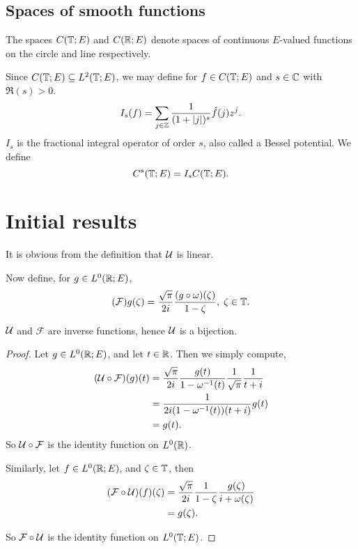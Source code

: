 \documentclass{unswmaths}
\begin{document}
\subsection*{Spaces of smooth functions}
The spaces $C(\mathbb{T};E)$ and $C(\mathbb{R};E)$ denote spaces of continuous $E$-valued functions on
the circle and line respectively.

Since $C(\mathbb{T};E) \subseteq L^2(\mathbb{T};E)$, we may define for $f \in C(\mathbb{T};E)$
and $s \in \mathbb{C}$ with $\Re(s) > 0$. 
\begin{equation*}
    I_s(f) = \sum_{j \in \mathbb{Z}} \frac{1}{(1+|j|)^s}\hat{f}(j)z^j.
\end{equation*}
$I_s$ is the fractional integral operator of order $s$, also called a Bessel potential.
We define
\begin{equation*}
    C^s(\mathbb{T};E) = I_sC(\mathbb{T};E).
\end{equation*}


\section*{Initial results}
It is obvious from the definition that $\mathcal{U}$ is linear. 

Now define, for $g \in L^0(\mathbb{R};E)$,
\begin{equation*}
    (\mathcal{F})g(\zeta) = \frac{\sqrt{\pi}}{2i}\frac{(g\circ \omega)(\zeta)}{1-\zeta},\;\zeta\in\mathbb{T}.
\end{equation*}

\begin{lemma}
    $\mathcal{U}$ and $\mathcal{F}$ are inverse functions, hence $\mathcal{U}$ is a bijection.
\end{lemma}
\begin{proof}
    Let $g \in L^0(\mathbb{R};E)$, and let $t \in \mathbb{R}$. Then we simply compute,
    \begin{align*}
        (\mathcal{U}\circ\mathcal{F})(g)(t) &= \frac{\sqrt{\pi}}{2i}\frac{g(t)}{1-\omega^{-1}(t)} \frac{1}{\sqrt{\pi}}\frac{1}{t+i}\\
        &= \frac{1}{2i(1-\omega^{-1}(t))(t+i)}g(t)\\
        &= g(t).
    \end{align*}
    So $\mathcal{U}\circ \mathcal{F}$ is the identity function on $L^0(\mathbb{R})$.
    
    Similarly, let $f \in L^0(\mathbb{R};E)$, and $\zeta \in \mathbb{T}$, then
    \begin{align*}
        (\mathcal{F}\circ\mathcal{U})(f)(\zeta) &= \frac{\sqrt{\pi}}{2i}\frac{1}{1-\zeta}\frac{g(\zeta)}{i+\omega(\zeta)}\\
        &= g(\zeta).
    \end{align*}
    
    So $\mathcal{F}\circ\mathcal{U}$ is the identity function on $L^0(\mathbb{T};E)$.
\end{proof}
\end{document}
